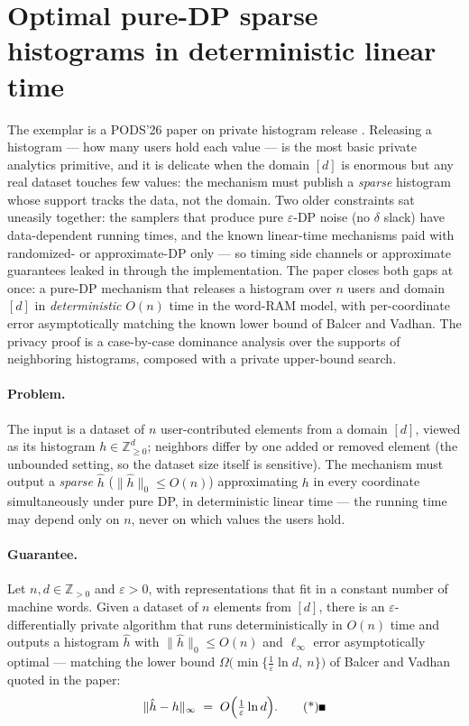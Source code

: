 \section{Optimal pure-DP sparse histograms in deterministic linear time}
\label{sec:dp-178}

The exemplar is a PODS'26 paper on private histogram release \citep{sigmod26-178}\pods.
Releasing a histogram --- how many users hold each value --- is the most basic private
analytics primitive, and it is delicate when the domain $[d]$ is enormous but any real
dataset touches few values: the mechanism must publish a \emph{sparse} histogram whose
support tracks the data, not the domain. Two older constraints sat uneasily together:
the samplers that produce pure $\varepsilon$-DP noise (no $\delta$ slack) have
data-dependent running times, and the known linear-time mechanisms paid with
randomized- or approximate-DP only --- so timing side channels or approximate
guarantees leaked in through the implementation. The paper closes both gaps at once: a
pure-DP mechanism that releases a histogram over $n$ users and domain $[d]$ in
\emph{deterministic} $O(n)$ time in the word-RAM model, with per-coordinate error
asymptotically matching the known lower bound of Balcer and Vadhan. The privacy proof
is a case-by-case dominance analysis over the supports of neighboring histograms,
composed with a private upper-bound search.

\paragraph{Problem.}
The input is a dataset of $n$ user-contributed elements from a domain $[d]$, viewed as
its histogram $h \in \mathbb{Z}_{\ge 0}^d$; neighbors differ by one added or removed
element (the unbounded setting, so the dataset size itself is sensitive). The
mechanism must output a \emph{sparse} $\hat h$ ($\|\hat h\|_0 \le O(n)$) approximating
$h$ in every coordinate simultaneously under pure DP, in deterministic linear time ---
the running time may depend only on $n$, never on which values the users hold.

\paragraph{Guarantee.}

\begin{theorem}\label{thm:dp-178-main}
Let $n, d \in \mathbb{Z}_{>0}$ and $\varepsilon > 0$, with representations that fit in a
constant number of machine words. Given a dataset of $n$ elements from $[d]$, there is
an $\varepsilon$-differentially private algorithm that runs deterministically in $O(n)$
time and outputs a histogram $\hat h$ with $\|\hat h\|_0 \le O(n)$ and
$\ell_\infty$ error asymptotically optimal --- matching the lower bound
$\Omega\bigl(\min\{\tfrac{1}{\varepsilon}\ln d,\ n\}\bigr)$ of Balcer and Vadhan quoted
in the paper:
\[
\|\hat h - h\|_\infty \;=\; O\Bigl(\tfrac{1}{\varepsilon}\ln d\Bigr). \eopm
\]
\end{theorem}

